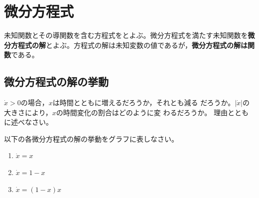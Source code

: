 \documentclass[twocolumn,11pt]{jarticle}
\begin{document}
\newpage
\section{微分方程式}

未知関数とその導関数を含む方程式をとよぶ。微分方程式を満たす未知関数を\textbf{微分方程式の解}とよぶ。方程式の解は未知変数の値であるが，\textbf{微分方程式の解は関数}である。

\subsection{微分方程式の解の挙動}
\nquestion
$\dot{x}>0$の場合，$x$は時間とともに増えるだろうか，それとも減る
だろうか。$|\dot{x}|$の大きさにより，$x$の時間変化の割合はどのように変
わるだろうか。
理由とともに述べなさい。

\nquestion
以下の各微分方程式の解の挙動をグラフに表しなさい。
\begin{enumerate}
\item $\dot{x}=x$
\item $\dot{x}=1-x$
\item $\dot{x}=(1-x)x$
\end{enumerate}
\end{document}
